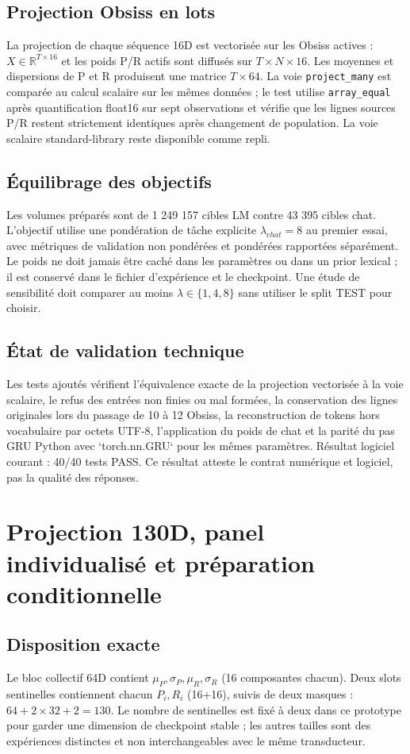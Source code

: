 \documentclass[11pt,a4paper]{report}
\begin{document}
\section{Projection Obsiss en lots}
La projection de chaque séquence 16D est vectorisée sur les Obsiss actives : $X\in\mathbb{R}^{T\times16}$ et les poids P/R actifs sont diffusés sur $T\times N\times16$. Les moyennes et dispersions de P et R produisent une matrice $T\times64$. La voie \texttt{project\_many} est comparée au calcul scalaire sur les mêmes données ; le test utilise \texttt{array\_equal} après quantification float16 sur sept observations et vérifie que les lignes sources P/R restent strictement identiques après changement de population. La voie scalaire standard-library reste disponible comme repli.

\section{Équilibrage des objectifs}
Les volumes préparés sont de 1 249 157 cibles LM contre 43 395 cibles chat. L'objectif utilise une pondération de tâche explicite $\lambda_{chat}=8$ au premier essai, avec métriques de validation non pondérées et pondérées rapportées séparément. Le poids ne doit jamais être caché dans les paramètres ou dans un prior lexical ; il est conservé dans le fichier d'expérience et le checkpoint. Une étude de sensibilité doit comparer au moins $\lambda\in\{1,4,8\}$ sans utiliser le split TEST pour choisir.

\section{État de validation technique}
Les tests ajoutés vérifient l'équivalence exacte de la projection vectorisée à la voie scalaire, le refus des entrées non finies ou mal formées, la conservation des lignes originales lors du passage de 10 à 12 Obsiss, la reconstruction de tokens hors vocabulaire par octets UTF-8, l'application du poids de chat et la parité du pas GRU Python avec `torch.nn.GRU` pour les mêmes paramètres. Résultat logiciel courant : 40/40 tests PASS. Ce résultat atteste le contrat numérique et logiciel, pas la qualité des réponses.


\chapter{Projection 130D, panel individualisé et préparation conditionnelle}
\section{Disposition exacte}
Le bloc collectif 64D contient $\mu_P,\sigma_P,\mu_R,\sigma_R$ (16 composantes chacun). Deux slots sentinelles contiennent chacun $P_i,R_i$ (16+16), suivis de deux masques : $64+2\times32+2=130$. Le nombre de sentinelles est fixé à deux dans ce prototype pour garder une dimension de checkpoint stable ; les autres tailles sont des expériences distinctes et non interchangeables avec le même transducteur.
\end{document}
